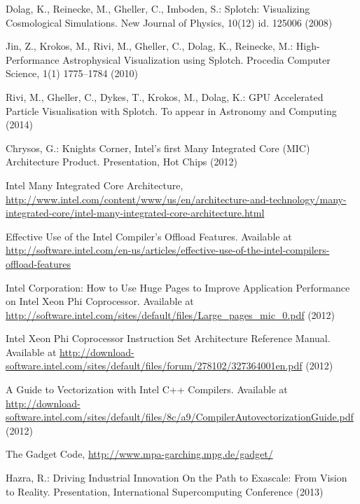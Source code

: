 \documentclass[runningheads,a4paper]{llncs}
\begin{document}
\begin{thebibliography}{4}

Dolag, K., Reinecke, M., Gheller, C., Imboden, S.: Splotch: Visualizing Cosmological Simulations. New Journal of Physics, 10(12)  id. 125006 (2008)

Jin, Z., Krokos, M., Rivi, M., Gheller, C., Dolag, K., Reinecke, M.: High-Performance Astrophysical Visualization using Splotch. 
  Procedia Computer Science, 1(1) 1775--1784 (2010)

Rivi, M., Gheller, C., Dykes, T., Krokos, M., Dolag, K.:  GPU Accelerated
  Particle Visualisation with Splotch. To appear in Astronomy and Computing (2014)
  
Chrysos, G.: Knights Corner, Intel’s first Many Integrated Core (MIC) Architecture Product. 
  Presentation, Hot Chips (2012) 

Intel Many Integrated Core Architecture, 
  \url{http://www.intel.com/content/www/us/en/architecture-and-technology/many-integrated-core/intel-many-integrated-core-architecture.html}

 Effective Use of the Intel Compiler's Offload Features.
  Available at \url{http://software.intel.com/en-us/articles/effective-use-of-the-intel-compilers-offload-features}

Intel Corporation: How to Use Huge Pages to Improve Application Performance on Intel Xeon Phi Coprocessor.
  Available at \url{http://software.intel.com/sites/default/files/Large_pages_mic_0.pdf} (2012)

Intel Xeon Phi Coprocessor Instruction Set Architecture Reference Manual.
  Available at \url{http://download-software.intel.com/sites/default/files/forum/278102/327364001en.pdf} (2012)

A Guide to Vectorization with Intel C++ Compilers.
  Available at \url{http://download-software.intel.com/sites/default/files/8c/a9/CompilerAutovectorizationGuide.pdf} (2012)


The Gadget Code, \url{http://www.mpa-garching.mpg.de/gadget/}

Hazra, R.: Driving Industrial Innovation On the Path to Exascale: From Vision to Reality. 
  Presentation, International Supercomputing Conference (2013)




\end{thebibliography}
\end{document}
